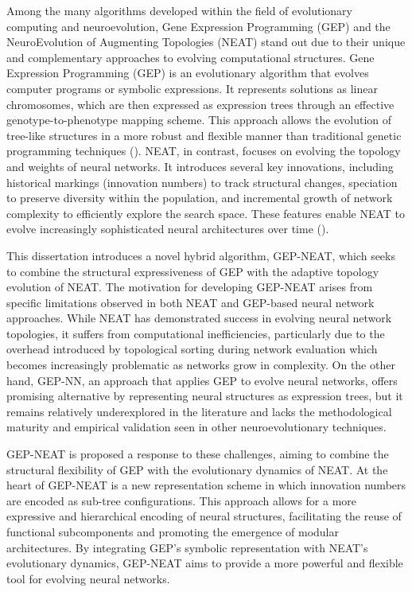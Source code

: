 \parbreak\noindent Among the many algorithms developed within the field of evolutionary computing and neuroevolution, Gene Expression Programming (GEP) and the NeuroEvolution of Augmenting Topologies (NEAT) stand out due to their unique and complementary approaches to evolving computational structures. Gene Expression Programming (GEP) is an evolutionary algorithm that evolves computer programs or symbolic expressions. It represents solutions as linear chromosomes, which are then expressed as expression trees through an effective genotype-to-phenotype mapping scheme. This approach allows the evolution of tree-like structures in a more robust and flexible manner than traditional genetic programming techniques (\cite{ferreira2006gene}). NEAT, in contrast, focuses on evolving the topology and weights of neural networks. It introduces several key innovations, including historical markings (innovation numbers) to track structural changes, speciation to preserve diversity within the population, and incremental growth of network complexity to efficiently explore the search space. These features enable NEAT to evolve increasingly sophisticated neural architectures over time (\cite{stanley2002evolving}).

\parbreak\noindent This dissertation introduces a novel hybrid algorithm, GEP-NEAT, which seeks to combine the structural expressiveness of GEP with the adaptive topology evolution of NEAT. The motivation for developing GEP-NEAT arises from specific limitations observed in both NEAT and GEP-based neural network approaches. While NEAT has demonstrated success in evolving neural network topologies, it suffers from computational inefficiencies, particularly due to the overhead introduced by topological sorting during network evaluation which becomes increasingly problematic as networks grow in complexity. On the other hand, GEP-NN, an approach that applies GEP to evolve neural networks, offers promising alternative by representing neural structures as expression trees, but it remains relatively underexplored in the literature and lacks the methodological maturity and empirical validation seen in other neuroevolutionary techniques.

\parbreak\noindent GEP-NEAT is proposed a response to these challenges, aiming to combine the structural flexibility of GEP with the evolutionary dynamics of NEAT. At the heart of GEP-NEAT is a new representation scheme in which innovation numbers are encoded as sub-tree configurations. This approach allows for a more expressive and hierarchical encoding of neural structures, facilitating the reuse of functional subcomponents and promoting the emergence of modular architectures. By integrating GEP's symbolic representation with NEAT's evolutionary dynamics, GEP-NEAT aims to provide a more powerful and flexible tool for evolving neural networks.

